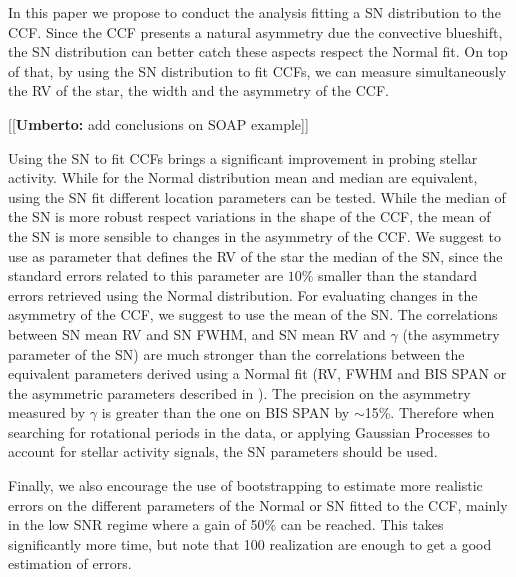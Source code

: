 \documentclass[11pt, oneside]{article}
\newcommand{\umberto}[1]{{\color{green}[[\textbf{Umberto: }#1]]}}
\begin{document}
In this paper we propose to conduct the analysis fitting a SN distribution to the CCF. Since the CCF presents a natural asymmetry due the convective blueshift, the SN distribution can better catch these aspects respect the Normal fit. On top of that, by using the SN distribution to fit CCFs, we can measure simultaneously the RV of the star, the width and the asymmetry of the CCF.

\umberto{add conclusions on SOAP example}

Using the SN to fit CCFs brings a significant improvement in probing stellar activity. While for the Normal distribution mean and median are equivalent, using the SN fit different location parameters can be tested. While the median of the SN is more robust respect variations in the shape of the CCF, the mean of the SN is more sensible to changes in the asymmetry of the CCF. We suggest to use as parameter that defines the RV of the star the median of the SN, since the standard errors related to this parameter are $10\%$ smaller than the standard errors retrieved using the Normal distribution. For evaluating changes in the asymmetry of the CCF, we suggest to use the mean of the SN. The correlations between SN mean RV and SN FWHM, and SN mean RV and $\gamma$ (the asymmetry parameter of the SN) are much stronger than the correlations between the equivalent parameters derived using a Normal fit (RV, FWHM and BIS SPAN or the asymmetric parameters described in \citet{Figueira-2013}). The precision on the asymmetry measured by $\gamma$ is greater than the one on BIS SPAN by $\sim$15\%. Therefore when searching for rotational periods in the data, or applying Gaussian Processes to account for stellar activity signals, the SN parameters should be used.

Finally, we also encourage the use of bootstrapping to estimate more realistic errors on the different parameters of the Normal or SN fitted to the CCF, mainly in the low SNR regime where a gain of 50\% can be reached. This takes significantly more time, but note that 100 realization are enough to get a good estimation of errors.


\end{document}
